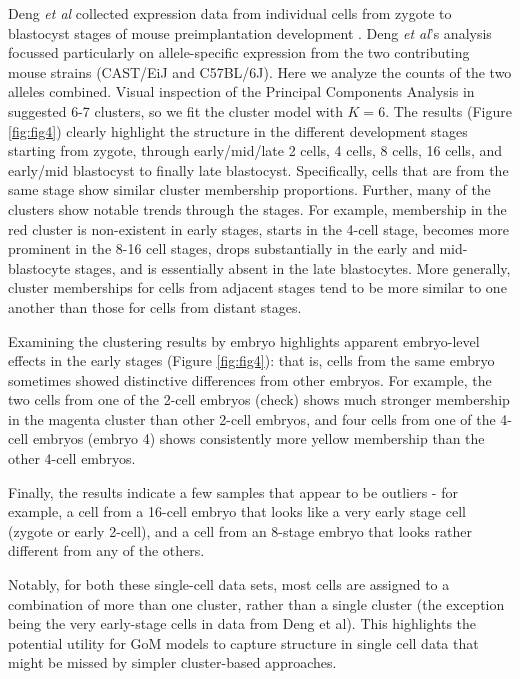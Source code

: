 Deng \textit{et al} collected expression data from individual cells from zygote to blastocyst stages of mouse preimplantation development \cite{Deng2014}. Deng \textit{et al}'s analysis focussed particularly on allele-specific expression from the two contributing mouse strains (CAST/EiJ and C57BL/6J). Here we analyze the counts of the two alleles combined. Visual inspection of the Principal Components Analysis in \cite{Deng2014} suggested 6-7 clusters, so we fit the cluster model with $K=6$. 
The results (Figure \ref{fig:fig4}) clearly highlight the structure in the different development stages starting from zygote, through early/mid/late 2 cells, 4 cells, 8 cells, 16 cells, and early/mid blastocyst to finally late blastocyst. Specifically, cells that are from the same stage show similar cluster membership proportions. Further, many of the clusters show notable trends through the stages. For example, 
membership in the red cluster is non-existent in early stages, starts in the 4-cell stage, becomes more prominent in the 8-16 cell stages, drops substantially in the early and mid-blastocyte stages, and is essentially absent in the late blastocytes. More generally, cluster memberships for cells from adjacent stages tend to be more similar to one another than those for cells from distant stages. 

Examining the clustering results by embryo highlights apparent embryo-level effects in the early stages (Figure \ref{fig:fig4}): that is, cells from the same embryo sometimes showed distinctive differences from other embryos. For example, the two cells from one of the 2-cell embryos (check) shows much stronger membership in the magenta cluster than other 2-cell embryos, and four cells from one of the 4-cell embryos (embryo 4) shows consistently more yellow membership than the other 4-cell embryos. 

Finally, the results indicate a few samples that appear to be outliers - for example, a cell from a 16-cell embryo that looks like a very early stage cell (zygote or early 2-cell), and a cell from an 8-stage embryo that looks rather different from any of the others.

Notably, for both these single-cell data sets, most cells are assigned to a combination of more than one cluster, rather than a single cluster (the exception being the very early-stage cells in data from Deng et al). This highlights the potential utility for GoM models to capture structure in single cell data that might be missed by simpler cluster-based approaches.

